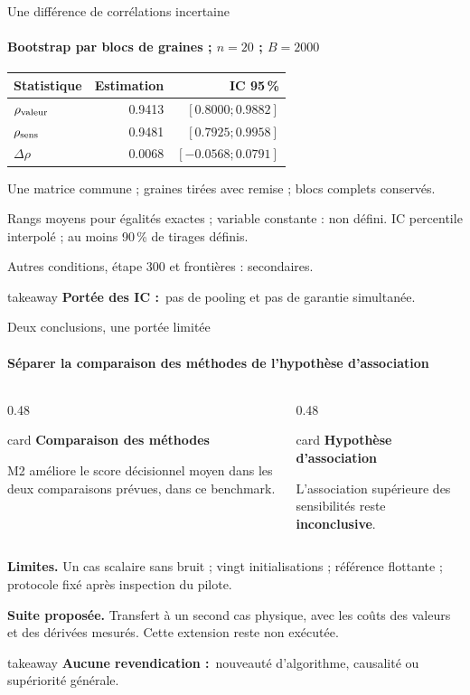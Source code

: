 \documentclass[aspectratio=169,11pt]{beamer}
\newcommand{\sectionlabel}{Question}
\newcommand{\card}[2]{%
  \begin{beamercolorbox}[wd=\linewidth,sep=7pt]{card}
  {\color{teal}\bfseries #1}\par\vspace{4pt}#2
  \end{beamercolorbox}}
\newcommand{\takeaway}[2]{%
  \begin{beamercolorbox}[wd=\linewidth,sep=7pt]{takeaway}
  \small\textbf{#1}\ #2
  \end{beamercolorbox}}
\begin{document}
\begin{frame}[t]{Une différence de corrélations incertaine}
\framesubtitle{Bootstrap par blocs de graines ; $n=20$ ; $B=2000$}
\begin{center}
\renewcommand{\arraystretch}{1.2}
\begin{tabular}{lrr}
\toprule
Statistique & Estimation & IC 95\,\%\\
\midrule
$\rho_{\rm valeur}$ &0.9413&$[0.8000;0.9882]$\\
$\rho_{\rm sens}$ &0.9481&$[0.7925;0.9958]$\\
$\Delta\rho$ &0.0068&$[-0.0568;0.0791]$\\
\bottomrule
\end{tabular}
\end{center}
\vspace{0.12cm}
Une matrice commune ; graines tirées avec remise ; blocs complets conservés.\par\vspace{0.13cm}
Rangs moyens pour égalités exactes ; variable constante : non défini.
IC percentile interpolé ; au moins 90\,\% de tirages définis.\par\vspace{0.13cm}
Autres conditions, étape 300 et frontières : secondaires.
\vfill
\takeaway{Portée des IC :}{pas de pooling et pas de garantie simultanée.}
\end{frame}

\renewcommand{\sectionlabel}{06 / Bilan}
\begin{frame}[t]{Deux conclusions, une portée limitée}
\framesubtitle{Séparer la comparaison des méthodes de l'hypothèse d'association}
\begin{columns}[T,onlytextwidth]
\begin{column}{0.48\textwidth}
\card{Comparaison des méthodes}{%
M2 améliore le score décisionnel moyen dans les deux comparaisons prévues,
dans ce benchmark.}
\end{column}
\begin{column}{0.48\textwidth}
\card{Hypothèse d'association}{%
L'association supérieure des sensibilités reste \textbf{inconclusive}.}
\end{column}
\end{columns}
\vspace{0.3cm}
\textbf{Limites.} Un cas scalaire sans bruit ; vingt initialisations ; référence
flottante ; protocole fixé après inspection du pilote.\par\vspace{0.17cm}
\textbf{Suite proposée.} Transfert à un second cas physique, avec les coûts
des valeurs et des dérivées mesurés. Cette extension reste non exécutée.
\vfill
\takeaway{Aucune revendication :}{nouveauté d'algorithme, causalité ou supériorité générale.}
\end{frame}
\end{document}
